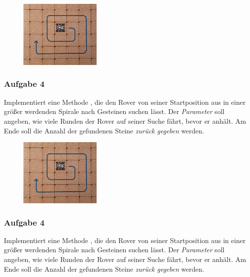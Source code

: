 \documentclass[10pt, a4paper]{scrartcl}
\begin{document}
\vspace{1cm}
\titlerule
\vspace{1cm}

\begin{wrapfig}
	\begin{figure}
		\includegraphics[width=4cm]{EF-AB.8-Abb_Spirale}
	\end{figure}
	
	\subsubsection*{Aufgabe 4}
	Implementiert eine Methode , die den Rover von seiner Startposition aus in einer größer werdenden Spirale nach Gesteinen suchen lässt. Der \emph{Parameter}  soll angeben, wie viele Runden der Rover auf seiner Suche fährt, bevor er anhält. Am Ende soll die Anzahl der gefundenen Steine \emph{zurück gegeben} werden.
\end{wrapfig}

\vspace{1cm}
\titlerule
\vspace{1cm}

\begin{wrapfig}
	\begin{figure}
		\includegraphics[width=4cm]{EF-AB.8-Abb_Spirale}
	\end{figure}
	
	\subsubsection*{Aufgabe 4}
	Implementiert eine Methode , die den Rover von seiner Startposition aus in einer größer werdenden Spirale nach Gesteinen suchen lässt. Der \emph{Parameter}  soll angeben, wie viele Runden der Rover auf seiner Suche fährt, bevor er anhält. Am Ende soll die Anzahl der gefundenen Steine \emph{zurück gegeben} werden.
\end{wrapfig}
\end{document}
